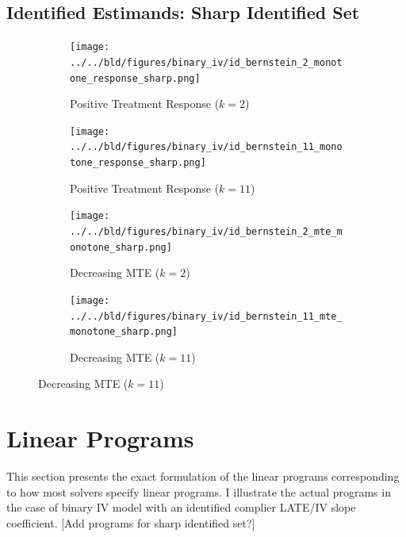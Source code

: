 \documentclass[12pt,a4paper,english]{article} %
\numberwithin{equation}{section}
\theoremstyle{definition}
\theoremstyle{remark}
\theoremstyle{plain}
\begin{document}
\subsection{Identified Estimands: Sharp Identified Set}
\begin{figure}

  \caption{Identified Sets for the Binary-IV-Bernstein: Shape Restrictions}\label{app_fig:id_set_binary_iv_bernstein_shape_restrictions_sharp}

  \centering
  \begin{subfigure}[b]{0.49\textwidth}
      \centering
      \texttt{[image: ../../bld/figures/binary\_iv/id\_bernstein\_2\_monotone\_response\_sharp.png]}
      \caption{Positive Treatment Response ($k=2$)}\label{app_fig:id_set_binary_iv_bernstein_k_2_monotone_response_sharp}
  \end{subfigure}
  \hfill
  \begin{subfigure}[b]{0.49\textwidth}
      \centering
      \texttt{[image: ../../bld/figures/binary\_iv/id\_bernstein\_11\_monotone\_response\_sharp.png]}
      \caption{Positive Treatment Response ($k=11$)}\label{app_fig:id_set_binary_iv_bernstein_k_11_monotone_response_sharp}
  \end{subfigure}

  \begin{subfigure}[b]{0.49\textwidth}
      \centering
      \texttt{[image: ../../bld/figures/binary\_iv/id\_bernstein\_2\_mte\_monotone\_sharp.png]}
      \caption{Decreasing MTE ($k=2$)}\label{app_fig:id_set_binary_iv_bernstein_k_2_mte_monotone_sharp}
  \end{subfigure}
  \hfill
  \begin{subfigure}[b]{0.49\textwidth}
      \centering
      \texttt{[image: ../../bld/figures/binary\_iv/id\_bernstein\_11\_mte\_monotone\_sharp.png]}
      \caption{Decreasing MTE ($k=11$)}\label{app_fig:id_set_binary_iv_bernstein_k_11_mte_monotone_sharp}
  \end{subfigure}
\end{figure}

\clearpage
\newpage

\section{Linear Programs}\label{app_sec:linear_programs}
This section presents the exact formulation of the linear programs corresponding to how most solvers specify linear programs.
I illustrate the actual programs in the case of binary IV model with an identified complier LATE/IV slope coefficient.
[Add programs for sharp identified set?]
\end{document}
